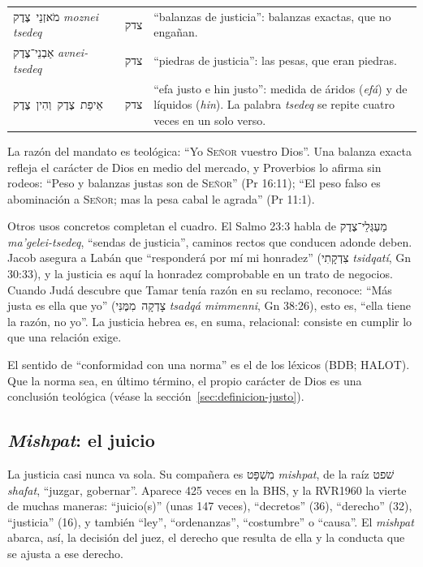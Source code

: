 \documentclass[11pt,letterpaper]{article}
\newcommand{\heb}[1]{\mbox{\foreignlanguage{hebrew}{#1}}}
\newcommand{\SENOR}{\textsc{Señor}}
\begin{document}
\begin{filologia}[Lv 19:36]
\begin{tabular}{@{}L{3.2cm}L{1.6cm}L{10cm}@{}}
\heb{מֹאזְנֵי צֶדֶק} \emph{moznei tsedeq} & \heb{צדק} & ``balanzas de justicia'': balanzas exactas, que no engañan. \\[2pt]
\heb{אַבְנֵי־צֶדֶק} \emph{avnei-tsedeq} & \heb{צדק} & ``piedras de justicia'': las pesas, que eran piedras. \\[2pt]
\heb{אֵיפַת צֶדֶק וְהִין צֶדֶק} & \heb{צדק} & ``efa justo e hin justo'': medida de áridos (\emph{efá}) y de líquidos (\emph{hin}). La palabra \emph{tsedeq} se repite cuatro veces en un solo verso. \\
\end{tabular}
\end{filologia}

La razón del mandato es teológica: ``Yo \SENOR{} vuestro Dios''. Una balanza exacta refleja el carácter de Dios en medio del mercado, y Proverbios lo afirma sin rodeos: ``Peso y balanzas justas son de \SENOR'' (Pr 16:11); ``El peso falso es abominación a \SENOR; mas la pesa cabal le agrada'' (Pr 11:1).

Otros usos concretos completan el cuadro. El Salmo 23:3 habla de \heb{מַעְגְּלֵי־צֶדֶק} \emph{ma'gelei-tsedeq}, ``sendas de justicia'', caminos rectos que conducen adonde deben. Jacob asegura a Labán que ``responderá por mí mi honradez'' (\heb{צִדְקָתִי} \emph{tsidqatí}, Gn 30:33), y la justicia es aquí la honradez comprobable en un trato de negocios. Cuando Judá descubre que Tamar tenía razón en su reclamo, reconoce: ``Más justa es ella que yo'' (\heb{צָדְקָה מִמֶּנִּי} \emph{tsadqá mimmenni}, Gn 38:26), esto es, ``ella tiene la razón, no yo''. La justicia hebrea es, en suma, relacional: consiste en cumplir lo que una relación exige.

\begin{nota}[Precisión]
El sentido de ``conformidad con una norma'' es el de los léxicos (BDB; HALOT). Que la norma sea, en último término, el propio carácter de Dios es una conclusión teológica (véase la sección~\ref{sec:definicion-justo}).
\end{nota}

\subsection{\emph{Mishpat}: el juicio}
La justicia casi nunca va sola. Su compañera es \heb{מִשְׁפָּט} \emph{mishpat}, de la raíz \heb{שׁפט} \emph{shafat}, ``juzgar, gobernar''. Aparece 425 veces en la BHS, y la RVR1960 la vierte de muchas maneras: ``juicio(s)'' (unas 147 veces), ``decretos'' (36), ``derecho'' (32), ``justicia'' (16), y también ``ley'', ``ordenanzas'', ``costumbre'' o ``causa''. El \emph{mishpat} abarca, así, la decisión del juez, el derecho que resulta de ella y la conducta que se ajusta a ese derecho.
\end{document}
